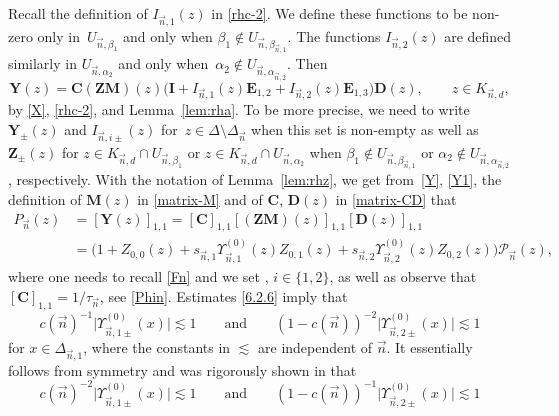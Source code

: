 \documentclass[10pt,a4paper]{amsart}
\numberwithin{equation}{section}
\newcommand{\n}{{\vec n}}
\begin{document}
Recall the definition of $ I_{\n,1}(z) $ in \eqref{rhc-2}. We define these functions to be non-zero only in~$ U_{\n,\beta_1} $ and only when $ \beta_1\not\in U_{\n,\beta_{\n,1}} $. The functions $ I_{\n,2}(z) $ are defined similarly in $ U_{\n,\alpha_2 } $ and only when~$ \alpha_2\not\in U_{\n,\alpha_{\n,2}} $. Then
\begin{equation}
\label{Y1}
\boldsymbol Y(z) = \boldsymbol C (\boldsymbol{ZM})(z)\bigl(\boldsymbol I+ I_{\n,1}(z)\boldsymbol E_{1,2}+ I_{\n,2}(z)\boldsymbol E_{1,3}\bigr)\boldsymbol D(z), \qquad z\in K_{\n,d},
\end{equation}
by \eqref{X}, \eqref{rhc-2}, and Lemma~\ref{lem:rha}. To be more precise, we need to write $ \boldsymbol Y_\pm(z) $ and $ I_{\n,i\pm}(z) $ for~${ z\in \Delta \setminus \Delta_\n }$ when this set is non-empty as well as $ \boldsymbol Z_\pm(z) $ for $ z\in K_{\n,d}\cap U_{\n,\beta_1} $ or $ z\in K_{\n,d}\cap U_{\n,\alpha_2} $ when $ \beta_1\notin U_{\n,\beta_{\n,1}} $ or $ \alpha_2\notin U_{\n,\alpha_{\n,2}} $, respectively. With the notation of Lemma~\ref{lem:rhz}, we get from~\eqref{Y}, \eqref{Y1}, the definition of $ \boldsymbol M(z) $ in \eqref{matrix-M} and of $ \boldsymbol C $, $ \boldsymbol D(z) $ in \eqref{matrix-CD} that
\begin{align}
P_\n(z) &= [\boldsymbol Y(z)]_{1,1} = [\boldsymbol C]_{1,1} [(\boldsymbol{ZM})(z)]_{1,1}[\boldsymbol D(z)]_{1,1} \nonumber \\
& = \bigl( 1 + Z_{0,0}(z) + s_{\n,1}\Upsilon_{\n,1}^{(0)}(z)Z_{0,1}(z) + s_{\n,2}\Upsilon_{\n,2}^{(0)}(z)Z_{0,2}(z) \bigr) \mathcal P_\n(z),
\label{Pn}
\end{align}
where one needs to recall \eqref{Fn} and we set \smash{$ s_{\n,i}:=S_\n^{(0)}(\infty)/S_\n^{(i)}(\infty) $}, $ i\in\{1,2\} $, as well as observe that $ [\boldsymbol C]_{1,1} = 1/\tau_\n $, see \eqref{Phin}. Estimates \eqref{6.2.6} imply that
\begin{equation}
\label{Up-bounds1}
c(\n)^{-1}\big|\Upsilon_{\n,1\pm}^{(0)}(x)\big| \lesssim 1 \qquad \text{and}\qquad  (1-c(\n))^{-2}\big|\Upsilon_{\n,2\pm}^{(0)}(x)\big| \lesssim 1
\end{equation}
for $ x\in \Delta_{\n,1} $, where the constants in $ \lesssim $ are independent of $ \n $. It essentially follows from symmetry and was rigorously shown in \cite[Lemma~5.2]{ApDenYa21} that
\begin{equation}
\label{Up-bounds2}
c(\n)^{-2}\big|\Upsilon_{\n,1\pm}^{(0)}(x)\big| \lesssim 1 \qquad \text{and}\qquad  (1-c(\n))^{-1}\big|\Upsilon_{\n,2\pm}^{(0)}(x)\big| \lesssim 1
\end{equation}
\end{document}
